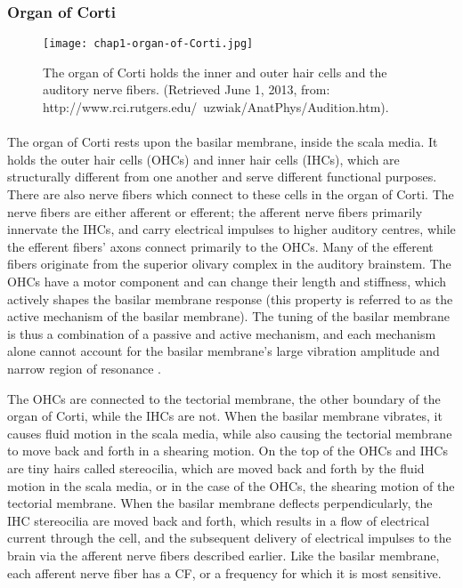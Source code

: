\subsubsection{Organ of Corti}

\begin{figure}[htbp]
\begin{center}
\texttt{[image: chap1-organ-of-Corti.jpg]} \\
\caption[Organ of Corti]{The organ of Corti holds the inner and outer hair cells and the auditory nerve fibers.  (Retrieved June 1, 2013, from:  http://www.rci.rutgers.edu/~uzwiak/AnatPhys/Audition.htm).}
\label{organ-of-Corti}
\end{center}
\end{figure}

\paragraph{}The organ of Corti rests upon the basilar membrane, inside the scala media.  It holds the outer hair cells (OHCs) and inner hair cells (IHCs), which are structurally different from one another and serve different functional purposes.  There are also nerve fibers which connect to these cells in the organ of Corti.  The nerve fibers are either afferent or efferent; the afferent nerve fibers primarily innervate the IHCs, and carry electrical impulses to higher auditory centres, while the efferent fibers' axons connect primarily to the OHCs.  Many of the efferent fibers originate from the superior olivary complex in the auditory brainstem.  The OHCs have a motor component and can change their length and stiffness, which actively shapes the basilar membrane response (this property is referred to as the active mechanism of the basilar membrane).  The tuning of the basilar membrane is thus a combination of a passive and active mechanism, and each mechanism alone cannot account for the basilar membrane's large vibration amplitude and narrow region of resonance \cite{Pickles2008}.

The OHCs are connected to the tectorial membrane, the other boundary of the organ of Corti, while the IHCs are not.  When the basilar membrane vibrates, it causes fluid motion in the scala media, while also causing the tectorial membrane to move back and forth in a shearing motion.  On the top of the OHCs and IHCs are tiny hairs called stereocilia, which are moved back and forth by the fluid motion in the scala media, or in the case of the OHCs, the shearing motion of the tectorial membrane.  When the basilar membrane deflects perpendicularly, the IHC stereocilia are moved back and forth, which results in a flow of electrical current through the cell, and the subsequent delivery of electrical impulses to the brain via the afferent nerve fibers described earlier.  Like the basilar membrane, each afferent nerve fiber has a CF, or a frequency for which it is most sensitive.

